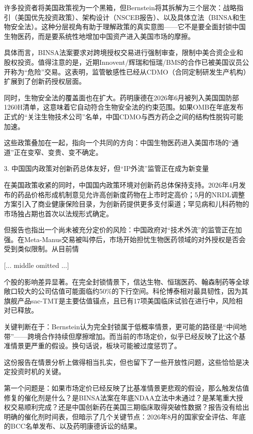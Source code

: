 \documentclass[11pt]{ctexart}
\begin{document}
许多投资者将美国政策视为一个黑箱，但Bernstein将其拆解为三个层次：战略指引（美国优先投资政策）、架构设计（NSCEB报告）、以及具体立法（BINSA和生物安全法）。这种分层视角有助于理解政策的真实意图——它不是要全面封锁中国生物医药，而是要系统性地增加中国资产进入美国市场的摩擦。

具体而言，BINSA法案要求对跨境授权交易进行强制审查，限制中美合资企业和股权投资。值得注意的是，近期Innovent/辉瑞和恒瑞/BMS的合作已被美国议员公开称为“危险”交易。这表明，监管敏感性已经从CDMO（合同定制研发生产机构）扩展到了创新药授权层面。

同时，生物安全法的覆盖面也在扩大。药明康德在2026年6月被列入美国国防部1260H清单，这意味着它自动符合生物安全法的约束范围。如果OMB在年底发布正式的“关注生物技术公司”名单，中国CDMO与西方药企之间的结构性脱钩可能加速。

这些政策叠加在一起，指向一个共同的方向：中国生物医药进入美国市场的“通道”正在变窄、变贵、变不确定。

3. 中国国内政策对创新药总体友好，但“IP外流”监管正在成为新变量

在美国政策收紧的同时，中国国内政策环境对创新药总体保持支持。2026年4月发布的药品价格形成机制意见允许高创新度药物在上市时定高价；5月的NRDL调整方案引入了商业健康保险目录，为创新药提供更多支付渠道；罕见病和儿科药物的市场独占期也首次以法规形式确定。

但报告也指出一个尚未被充分定价的风险：中国政府对“技术外流”的监管正在加强。在Meta-Manus交易被叫停后，市场开始担忧生物医药领域的对外授权是否会受到类似限制。从目前情

[... middle omitted ...]

个股的影响差异显著。在完全封锁情景下，信达生物、恒瑞医药、翰森制药等全球敞口较大的公司估值可能面临约50\%的下行空间。科伦博泰相对最具韧性，因为其旗舰产品sac-TMT是主要估值锚点，且已有17项美国临床试验在进行中，风险相对已释放。

关键判断在于：Bernstein认为完全封锁属于低概率情景，更可能的路径是“中间地带”——跨境合作持续但摩擦增加。而当前的市场定价，似乎已经反映了比这个基准情景更严重的假设。换句话说，板块可能被过度惩罚了。

这份报告在情景分析上做得相当扎实，但也留下了一些开放性问题，这些恰恰是决定投资时机的关键。

第一个问题是：如果市场定价已经反映了比基准情景更悲观的假设，那么触发估值修复的催化剂是什么？是BINSA法案在年底NDAA立法中未通过？是某笔重大授权交易顺利完成？还是中国创新药在美国三期临床取得突破性数据？报告没有给出明确的催化剂时间表，但暗示了几个关键节点：2026年8月的国家安全评估、年底的BCC名单发布、以及药明康德诉讼的结果。
\end{document}
